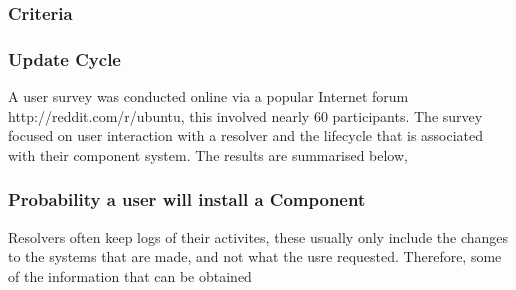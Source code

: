 \subsubsection{Criteria}

\subsubsection{Update Cycle}

A user survey was conducted online via a popular Internet forum http://reddit.com/r/ubuntu, this involved nearly 60 participants. %
The survey focused on user interaction with a resolver and the lifecycle that is associated with their component system.
The results are summarised below, %



\subsubsection{Probability a user will install a Component}
Resolvers often keep logs of their activites, these usually only include the changes to the systems that are made, and not what the usre requested.
Therefore, some of the information that can be obtained






